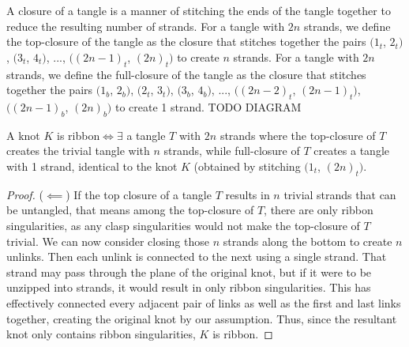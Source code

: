 \begin{paper}
A closure of a tangle is a manner of stitching the ends of the tangle together
to reduce the resulting number of strands.
For a tangle with $2n$ strands, we define the top-closure of the tangle as the
closure that stitches together the pairs $(1_t$, $2_t)$, $(3_t$, $4_t)$, ...,
$((2n-1)_t$, $(2n)_t)$ to create $n$ strands.
For a tangle with $2n$ strands, we define the full-closure of the tangle as the
closure that stitches together the pairs $(1_b$, $2_b)$, $(2_t$, $3_t)$, $(3_b$,
$4_b)$, ..., $((2n-2)_t$, $(2n-1)_t)$, $((2n-1)_b$, $(2n)_b)$ to create 1
strand.
TODO DIAGRAM
\begin{theorem}
A knot $K$ is ribbon$\iff\exists$ a tangle $T$ with $2n$ strands where the
top-closure of $T$ creates the trivial tangle with $n$ strands, while
full-closure of $T$ creates a tangle with 1 strand, identical to the knot $K$
(obtained by stitching $(1_t$, $(2n)_t)$.
\end{theorem}
\begin{proof}
($\impliedby$)
If the top closure of a tangle $T$ results in $n$ trivial strands that can be
untangled, that means among the top-closure of $T$, there are only ribbon
singularities, as any clasp singularities would not make the top-closure of $T$
trivial.
We can now consider closing those $n$ strands along the bottom to create $n$
unlinks.
Then each unlink is connected to the next using a single strand.
That strand may pass through the plane of the original knot, but if it were to
be unzipped into strands, it would result in only ribbon singularities.
This has effectively connected every adjacent pair of links as well as the first
and last links together, creating the original knot by our assumption.
Thus, since the resultant knot only contains ribbon singularities, $K$ is
ribbon.
\end{proof}
\end{paper}

